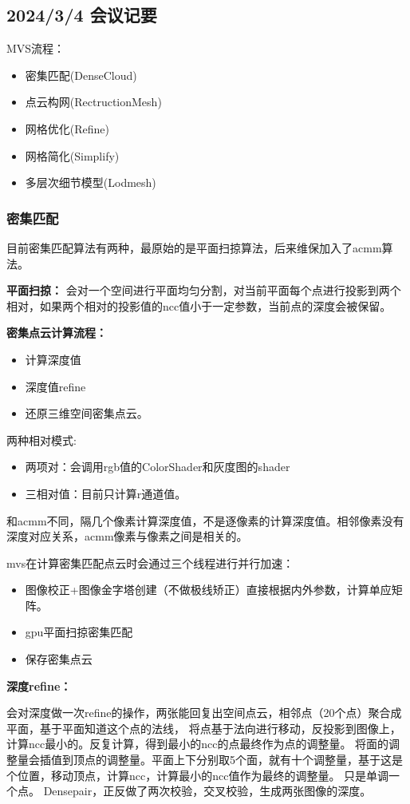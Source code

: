 \subsection{2024/3/4 会议记要}
MVS流程：
\begin{itemize}
	\item 密集匹配(DenseCloud)
	\item 点云构网(RectructionMesh)
	\item 网格优化(Refine)
	\item 网格简化(Simplify)
	\item 多层次细节模型(Lodmesh)
\end{itemize}

\subsubsection{密集匹配}
目前密集匹配算法有两种，最原始的是平面扫掠算法，后来维保加入了acmm算法。

\textbf{平面扫掠：}
会对一个空间进行平面均匀分割，对当前平面每个点进行投影到两个相对，如果两个相对的投影值的ncc值小于一定参数，当前点的深度会被保留。


\textbf{密集点云计算流程：}
\begin{itemize}
	\item 计算深度值
	\item 深度值refine
	\item 还原三维空间密集点云。
\end{itemize}

两种相对模式:
\begin{itemize}
	\item 两项对：会调用rgb值的ColorShader和灰度图的shader
	\item 三相对值：目前只计算r通道值。
\end{itemize}

和acmm不同，隔几个像素计算深度值，不是逐像素的计算深度值。相邻像素没有深度对应关系，acmm像素与像素之间是相关的。

mvs在计算密集匹配点云时会通过三个线程进行并行加速：

\begin{itemize}
	\item 图像校正+图像金字塔创建（不做极线矫正）直接根据内外参数，计算单应矩阵。
	\item gpu平面扫掠密集匹配
	\item 保存密集点云
\end{itemize}

\textbf{深度refine：}

会对深度做一次refine的操作，两张能回复出空间点云，相邻点（20个点）聚合成平面，基于平面知道这个点的法线，
将点基于法向进行移动，反投影到图像上，计算ncc最小的。反复计算，得到最小的ncc的点最终作为点的调整量。
将面的调整量会插值到顶点的调整量。平面上下分别取5个面，就有十个调整量，基于这是个位置，移动顶点，计算ncc，计算最小的ncc值作为最终的调整量。
只是单调一个点。
Densepair，正反做了两次校验，交叉校验，生成两张图像的深度。

